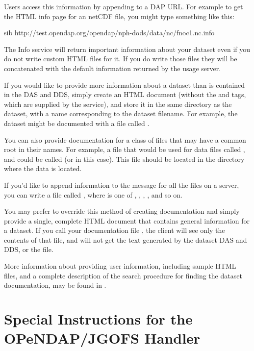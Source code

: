 \documentclass{dods-book}
\begin{document}
Users access this information by appending  to a DAP URL.
For example to get the HTML info page for an netCDF file, you might
type something like this:

\begin{vcode}{sib}
http://test.opendap.org/opendap/nph-dods/data/nc/fnoc1.nc.info
\end{vcode}

The Info service will return important information about your dataset
even if you do not write custom HTML files for it. If you do write
those files they will be concatenated with the default information
returned by the usage server.

If you would like to provide more information about a dataset than is
contained in the DAS and DDS, simply create an HTML document (without
the  and  tags, which are supplied by the
 service), and store it in the same directory as the
dataset, with a name corresponding to the dataset filename.  For
example, the dataset  might be documented with a file
called .

You can also provide documentation for a class of files that may have
a common root in their names.  For example, a file that would be used
for data files called ,  and
 could be called  (or  in
this case). This file should be located in the directory where the
data is located.

If you'd like to append information to the  message for all
the files on a server, you can write a file called
, where  is one of
, , , , and so on.

You may prefer to override this method of creating documentation and
simply provide a single, complete HTML document that contains general
information for a dataset.  If you call your documentation file
, the client will see only the contents of that file,
and will not get the text generated by the dataset DAS and DDS, or the
 file.

More information about providing user information, including sample
HTML files, and a complete description of the search procedure for
finding the dataset documentation, may be found in \DODSapi .

\section{Special Instructions for the OPeNDAP/JGOFS Handler}
\end{document}
